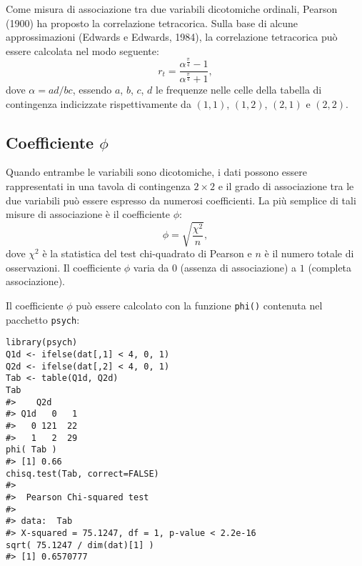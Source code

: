 Come misura di associazione tra due variabili dicotomiche ordinali, Pearson (1900) ha proposto la correlazione tetracorica.  Sulla base di alcune approssimazioni (Edwards e Edwards, 1984), la correlazione tetracorica può essere calcolata nel modo seguente:
$$
r_{t}=\frac{\alpha^{\frac{\pi}{4}} -1}{\alpha^{\frac{\pi}{4}} +1},
$$
dove $\alpha=ad/bc$, essendo $a$, $b$, $c$, $d$ le frequenze nelle
celle della tabella di contingenza indicizzate rispettivamente da
$(1,1)$, $(1,2)$, $(2,1)$ e $(2,2)$.  


\subsection{Coefficiente $\phi$}

Quando entrambe le variabili sono dicotomiche, i dati possono essere rappresentati in una tavola di contingenza $2 \times 2$ e il grado di associazione tra le due variabili può essere espresso da numerosi coefficienti. La più semplice di tali misure di associazione è il coefficiente $\phi$:
\begin{equation}
\phi = \sqrt{ \frac{\chi^2}{n} }, 
\end{equation}
dove $\chi^2$ è la statistica del test chi-quadrato di Pearson e $n$ è
il numero totale di osservazioni.  Il coefficiente $\phi$ varia da $0$
(assenza di associazione) a $1$ (completa associazione). 


\begin{exmp}

Il coefficiente $\phi$ può essere calcolato con la funzione {\tt phi()} contenuta nel pacchetto {\tt psych}:
\begin{lstlisting}
library(psych) 
Q1d <- ifelse(dat[,1] < 4, 0, 1)
Q2d <- ifelse(dat[,2] < 4, 0, 1)
Tab <- table(Q1d, Q2d)
Tab
#>    Q2d
#> Q1d   0   1
#>   0 121  22
#>   1   2  29
phi( Tab )
#> [1] 0.66
chisq.test(Tab, correct=FALSE)
#> 
#> 	Pearson Chi-squared test
#> 
#> data:  Tab 
#> X-squared = 75.1247, df = 1, p-value < 2.2e-16
sqrt( 75.1247 / dim(dat)[1] )
#> [1] 0.6570777
\end{lstlisting}

\end{exmp}


